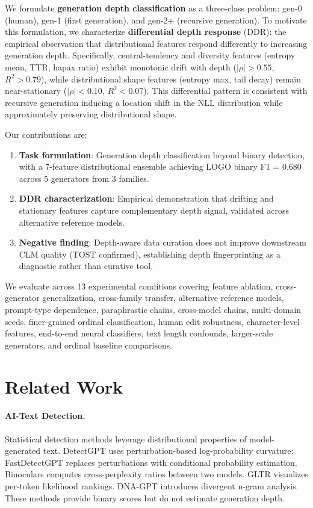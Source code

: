 \documentclass[11pt]{article}
\begin{document}
We formulate \textbf{generation depth classification} as a three-class problem: gen-0 (human), gen-1 (first generation), and gen-2+ (recursive generation). To motivate this formulation, we characterize \textbf{differential depth response} (DDR): the empirical observation that distributional features respond differently to increasing generation depth. Specifically, central-tendency and diversity features (entropy mean, TTR, hapax ratio) exhibit monotonic drift with depth ($|\rho| > 0.55$, $R^2 > 0.79$), while distributional shape features (entropy max, tail decay) remain near-stationary ($|\rho| < 0.10$, $R^2 < 0.07$). This differential pattern is consistent with recursive generation inducing a location shift in the NLL distribution while approximately preserving distributional shape.

Our contributions are:
\begin{enumerate}[nosep]
    \item \textbf{Task formulation}: Generation depth classification beyond binary detection, with a 7-feature distributional ensemble achieving LOGO binary F1 = 0.680 across 5 generators from 3 families.
    \item \textbf{DDR characterization}: Empirical demonstration that drifting and stationary features capture complementary depth signal, validated across alternative reference models.
    \item \textbf{Negative finding}: Depth-aware data curation does not improve downstream CLM quality (TOST confirmed), establishing depth fingerprinting as a diagnostic rather than curative tool.
\end{enumerate}

We evaluate across 13 experimental conditions covering feature ablation, cross-generator generalization, cross-family transfer, alternative reference models, prompt-type dependence, paraphrastic chains, cross-model chains, multi-domain seeds, finer-grained ordinal classification, human edit robustness, character-level features, end-to-end neural classifiers, text length confounds, larger-scale generators, and ordinal baseline comparisons.

\section{Related Work}
\label{sec:related}

\paragraph{AI-Text Detection.}
Statistical detection methods leverage distributional properties of model-generated text. DetectGPT \cite{mitchell2023detectgpt} uses perturbation-based log-probability curvature; FastDetectGPT \cite{bao2024fastdetectgpt} replaces perturbations with conditional probability estimation. Binoculars \cite{hans2024binoculars} computes cross-perplexity ratios between two models. GLTR \cite{gehrmann2019gltr} visualizes per-token likelihood rankings. DNA-GPT introduces divergent n-gram analysis. These methods provide binary scores but do not estimate generation depth.
\end{document}
